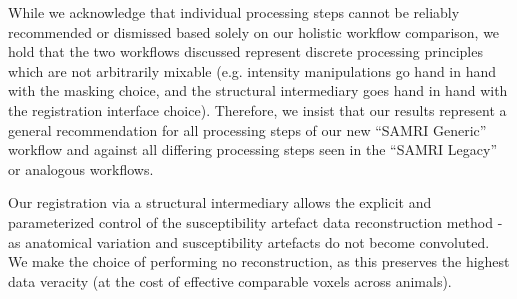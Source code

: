 While we acknowledge that individual processing steps cannot be reliably recommended or dismissed based solely on our holistic workflow comparison, we hold that the two workflows discussed represent discrete processing principles which are not arbitrarily mixable (e.g. intensity manipulations go hand in hand with the masking choice, and the structural intermediary goes hand in hand with the registration interface choice).
Therefore, we insist that our results represent a general recommendation for all processing steps of our new “SAMRI Generic” workflow and against all differing processing steps seen in the “SAMRI Legacy” or analogous workflows.

Our registration via a structural intermediary allows the explicit and parameterized control of the susceptibility artefact data reconstruction method - as anatomical variation and susceptibility artefacts do not become convoluted.
We make the choice of performing no reconstruction, as this preserves the highest data veracity (at the cost of effective comparable voxels across animals).
